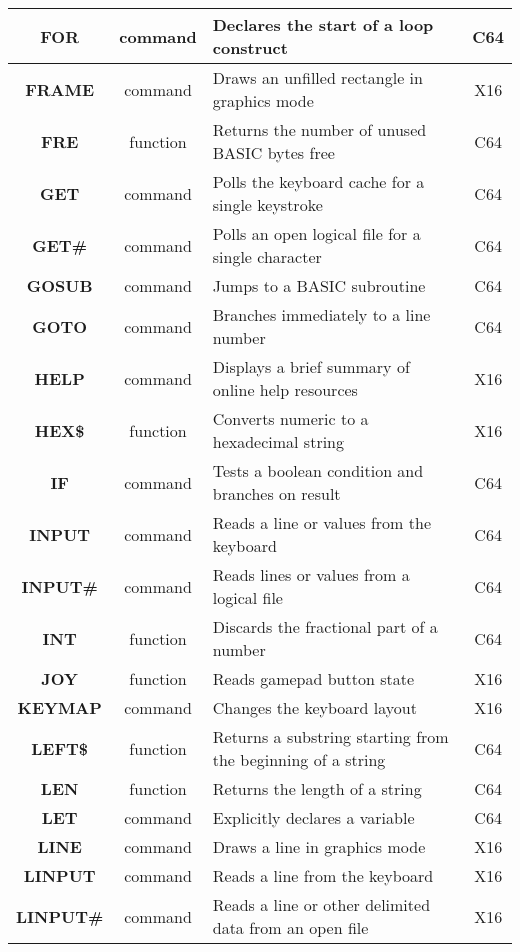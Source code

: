 \begin{longtable}{|c|c|m{4cm}|c|}
	{\bfseries FOR} & command & Declares the start of a loop construct & C64 \\ \hline
	{\bfseries FRAME} & command & Draws an unfilled rectangle in graphics mode & X16 \\ \hline
	{\bfseries FRE} & function & Returns the number of unused BASIC bytes free & C64 \\ \hline
	{\bfseries GET} & command & Polls the keyboard cache for a single keystroke & C64 \\ \hline
	{\bfseries GET\#} & command & Polls an open logical file for a single character & C64 \\ \hline
	{\bfseries GOSUB} & command & Jumps to a BASIC subroutine & C64 \\ \hline
	{\bfseries GOTO} & command & Branches immediately to a line number & C64 \\ \hline
	{\bfseries HELP} & command & Displays a brief summary of online help resources & X16 \\ \hline
	{\bfseries HEX\$} & function & Converts numeric to a hexadecimal string & X16 \\ \hline
	{\bfseries IF} & command & Tests a boolean condition and branches on result & C64 \\ \hline
	{\bfseries INPUT} & command & Reads a line or values from the keyboard & C64 \\ \hline
	{\bfseries INPUT\#} & command & Reads lines or values from a logical file & C64 \\ \hline
	{\bfseries INT} & function & Discards the fractional part of a number & C64 \\ \hline
	{\bfseries JOY} & function & Reads gamepad button state & X16 \\ \hline
	{\bfseries KEYMAP} & command & Changes the keyboard layout & X16 \\ \hline
	{\bfseries LEFT\$} & function & Returns a substring starting from the beginning of a string & C64 \\ \hline
	{\bfseries LEN} & function & Returns the length of a string & C64 \\ \hline
	{\bfseries LET} & command & Explicitly declares a variable & C64 \\ \hline
	{\bfseries LINE} & command & Draws a line in graphics mode & X16 \\ \hline
	{\bfseries LINPUT} & command & Reads a line from the keyboard & X16 \\ \hline
	{\bfseries LINPUT\#} & command & Reads a line or other delimited data from an open file & X16 \\ \hline

\end{longtable}
